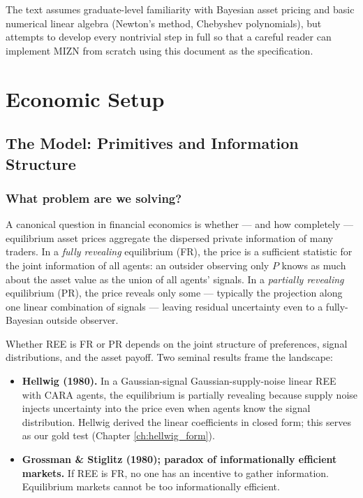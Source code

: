 \documentclass[11pt,oneside]{book}
\theoremstyle{definition}
\begin{document}
The text assumes graduate-level familiarity with Bayesian asset pricing and
basic numerical linear algebra (Newton's method, Chebyshev polynomials), but
attempts to develop every nontrivial step in full so that a careful reader
can implement MIZN from scratch using this document as the specification.

\mainmatter

\part{Economic Setup}
\label{part:econ}

\chapter{The Model: Primitives and Information Structure}

\section{What problem are we solving?}

A canonical question in financial economics is whether --- and how completely
--- equilibrium asset prices aggregate the dispersed private information of
many traders. In a \emph{fully revealing} equilibrium (FR), the price is a
sufficient statistic for the joint information of all agents: an outsider
observing only $P$ knows as much about the asset value as the union of all
agents' signals. In a \emph{partially revealing} equilibrium (PR), the price
reveals only some --- typically the projection along one linear combination of
signals --- leaving residual uncertainty even to a fully-Bayesian outside
observer.

Whether REE is FR or PR depends on the joint structure of preferences, signal
distributions, and the asset payoff. Two seminal results frame the
landscape:

\begin{itemize}
\item \textbf{Hellwig (1980).} In a Gaussian-signal Gaussian-supply-noise
linear REE with CARA agents, the equilibrium is partially revealing because
supply noise injects uncertainty into the price even when agents know the
signal distribution. Hellwig derived the linear coefficients in closed form;
this serves as our gold test (Chapter \ref{ch:hellwig_form}).

\item \textbf{Grossman \& Stiglitz (1980); paradox of informationally
efficient markets.} If REE is FR, no one has an incentive to gather information.
Equilibrium markets cannot be too informationally efficient.
\end{itemize}
\end{document}
